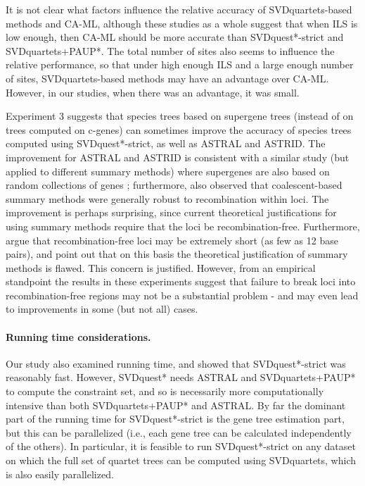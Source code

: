 It is not clear what factors influence the relative accuracy of SVDquartets-based methods and CA-ML, although these studies as a whole
suggest that when ILS is low enough, then CA-ML should be more accurate than SVDquest*-strict and SVDquartets+PAUP*.
The total number of sites also seems to influence the relative performance, so that under high enough ILS and a large enough number of
sites, SVDquartets-based methods may have an advantage over CA-ML.
However, in our studies, when there was an advantage, it was small.


 Experiment 3 suggests that species trees based on supergene trees
(instead of on trees computed on c-genes)
 can sometimes improve the accuracy of species trees computed using
 SVDquest*-strict, as well as ASTRAL and ASTRID.
 The improvement for ASTRAL and ASTRID is consistent with
a similar study (but applied to different summary methods) where supergenes are also based on random collections of genes \cite{bayzid2013naive}; furthermore, 
\cite{LanierKnowles2012}  also observed that coalescent-based summary
methods were generally robust to recombination within loci.
The  improvement is perhaps surprising, since current
theoretical justifications for using summary methods require that the
loci be recombination-free. Furthermore, \cite{SpringerGatesy2016} argue
that recombination-free loci may be extremely short (as few as 12 base
pairs), and point out that on this basis the theoretical justification
of summary methods is flawed.  This concern is justified. However,
from an empirical standpoint the results in these experiments suggest
that failure to break loci into recombination-free regions may not be
a substantial problem - and may even lead to improvements in some
(but not all)
cases.

 
\paragraph{Running time considerations. }


Our study also examined running time, and showed that SVDquest*-strict was reasonably fast. However, 
SVDquest*  needs ASTRAL and SVDquartets+PAUP* to compute the constraint set, and so 
is necessarily more computationally intensive than both SVDquartets+PAUP* and ASTRAL.
By far the dominant part of the running time for SVDquest*-strict  is the gene tree estimation part,  but this can be parallelized (i.e., each gene tree
can be calculated independently of the others).
In particular, it is feasible to run 
SVDquest*-strict on any dataset on which the full set of quartet trees can be computed using SVDquartets, which  is also easily parallelized.



